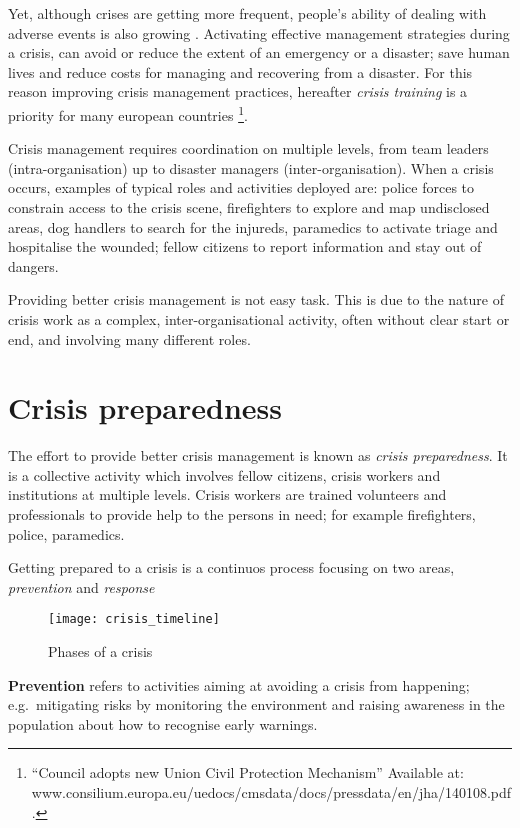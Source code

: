 Yet, although crises are getting more frequent, people's ability of
dealing with adverse events is also growing \autocite{Boin:2009bv}.
Activating effective management strategies during a crisis, can avoid or
reduce the extent of an emergency or a disaster; save human lives and
reduce costs for managing and recovering from a disaster. For this
reason improving crisis management practices, hereafter \emph{crisis
training} is a priority for many european countries \footnote{``Council
  adopts new Union Civil Protection Mechanism'' Available at:
  www.consilium.europa.eu/uedocs/cmsdata/docs/pressdata/en/jha/140108.pdf.}.

Crisis management requires coordination on multiple levels, from team
leaders (intra-organisation) up to disaster managers
(inter-organisation). When a crisis occurs, examples of typical roles
and activities deployed are: police forces to constrain access to the
crisis scene, firefighters to explore and map undisclosed areas, dog
handlers to search for the injureds, paramedics to activate triage and
hospitalise the wounded; fellow citizens to report information and stay
out of dangers.

Providing better crisis management is not easy task. This is due to the
nature of crisis work as a complex, inter-organisational activity, often
without clear start or end, and involving many different roles.

\section{Crisis preparedness}\label{crisis-preparedness}

The effort to provide better crisis management is known as \emph{crisis
preparedness}. It is a collective activity which involves fellow
citizens, crisis workers and institutions at multiple levels. Crisis
workers are trained volunteers and professionals to provide help to the
persons in need; for example firefighters, police, paramedics.

Getting prepared to a crisis is a continuos process focusing on two
areas, \emph{prevention} and \emph{response} \autocite{Deverell:2009fk}

\begin{figure}[h!]
    \centering
    \texttt{[image: crisis\_timeline]}
    \caption{Phases of a crisis}
    \label{fig:phases}
\end{figure}

\textbf{Prevention} refers to activities aiming at avoiding a crisis
from happening; e.g.~mitigating risks by monitoring the environment and
raising awareness in the population about how to recognise early
warnings.

